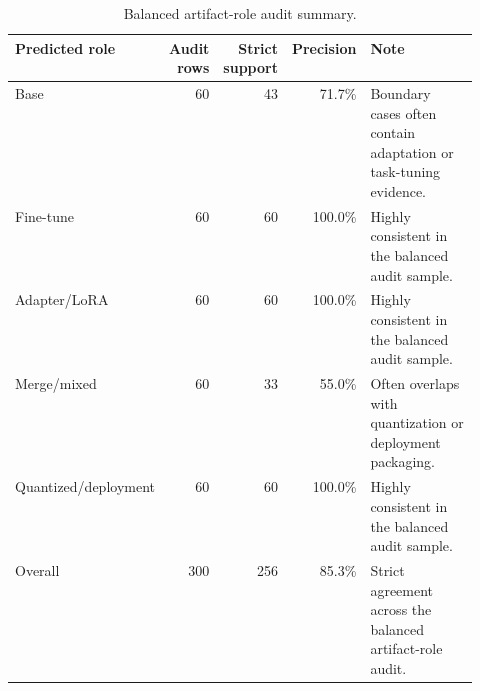 \begin{table}[t]
\centering
\caption{Balanced artifact-role audit summary.}
\label{tab:role-audit}
\small
\begin{tabular}{p{0.20\linewidth}r r r p{0.34\linewidth}}
\toprule
Predicted role & Audit rows & Strict support & Precision & Note \\
\midrule
Base & 60 & 43 & 71.7\% & Boundary cases often contain adaptation or task-tuning evidence. \\
Fine-tune & 60 & 60 & 100.0\% & Highly consistent in the balanced audit sample. \\
Adapter/LoRA & 60 & 60 & 100.0\% & Highly consistent in the balanced audit sample. \\
Merge/mixed & 60 & 33 & 55.0\% & Often overlaps with quantization or deployment packaging. \\
Quantized/deployment & 60 & 60 & 100.0\% & Highly consistent in the balanced audit sample. \\
Overall & 300 & 256 & 85.3\% & Strict agreement across the balanced artifact-role audit. \\
\bottomrule
\end{tabular}
\end{table}
